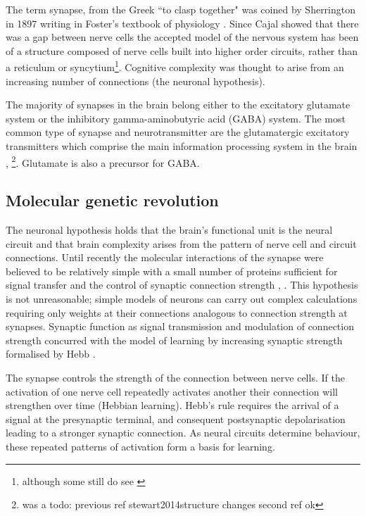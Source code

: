 The term synapse, from the Greek ``to clasp together" was coined by Sherrington in 1897 writing in Foster’s textbook of physiology \cite{foster1895text}. Since Cajal showed that there was a gap between nerve cells the accepted model of the nervous system has been of a structure composed of nerve cells built into higher order circuits\cite{ramon1911histologie},\cite{grant2018synapse} rather than a reticulum or syncytium\footnote{although some still do see \cite{bacsar2016clair}}. Cognitive complexity was thought to arise from an increasing number of connections (the neuronal hypothesis)\cite{grant2018synaptomic}.

 The majority of synapses in the brain belong either to the excitatory glutamate system or the inhibitory gamma-aminobutyric acid (GABA) system. The most common type of synapse and neurotransmitter are the glutamatergic excitatory transmitters which comprise the main information processing system in the brain \cite{stewart2014structure},\cite{niciu2012overview} \footnote{was a todo: previous ref stewart2014structure changes second ref ok}. Glutamate is also a precursor for GABA. 


\subsection{Molecular genetic revolution}
\label{sec:molecular genetic revolution}
 The neuronal hypothesis holds that the brain's functional unit is the neural circuit and that brain complexity arises from the pattern of nerve cell and circuit connections\cite{grant2018synaptomic}. Until recently the molecular interactions of the synapse were believed to be relatively simple with a small number of proteins sufficient for signal transfer and the control of synaptic connection strength \cite{grant2019synapse}, \cite{lisman1994cam}. This hypothesis is not unreasonable; simple models of neurons can carry out complex calculations requiring only weights at their connections analogous to connection strength at synapses\cite{hinton2007learning}. Synaptic function as signal transmission and modulation of connection strength concurred with the model of learning by increasing synaptic strength formalised by Hebb \cite{hebb1949organization_check}.
 
 The synapse controls the strength of the connection between nerve cells. If the activation of one nerve cell repeatedly activates another their connection will strengthen over time (Hebbian learning)\cite{hebb1949organization_check}. Hebb's rule \cite{hebb1949organization_check} requires the arrival of a signal at the presynaptic terminal, and consequent postsynaptic depolarisation leading to a stronger synaptic connection.  As neural circuits determine behaviour, these repeated patterns of activation form a basis for learning.%

